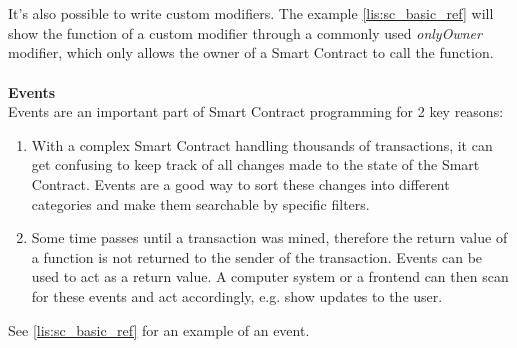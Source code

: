 \\\\
It's also possible to write custom modifiers. The example \ref{lis:sc_basic_ref} will show the function of a custom modifier through a commonly used \textit{onlyOwner} modifier, which only allows the owner of a Smart Contract to call the function.
\\\\
\textbf{Events}\\
Events are an important part of Smart Contract programming for 2 key reasons:
\begin{enumerate}
  \item With a complex Smart Contract handling thousands of transactions, it can get confusing to keep track of all changes made to the state of the Smart Contract. Events are a good way to sort these changes into different categories and make them searchable by specific filters.
  \item Some time passes until a transaction was mined, therefore the return value of a function is not returned to the sender of the transaction. Events can be used to act as a return value. A computer system or a frontend can then scan for these events and act accordingly, e.g. show updates to the user.  
\end{enumerate}
See \ref{lis:sc_basic_ref} for an example of an event.
\\\\
